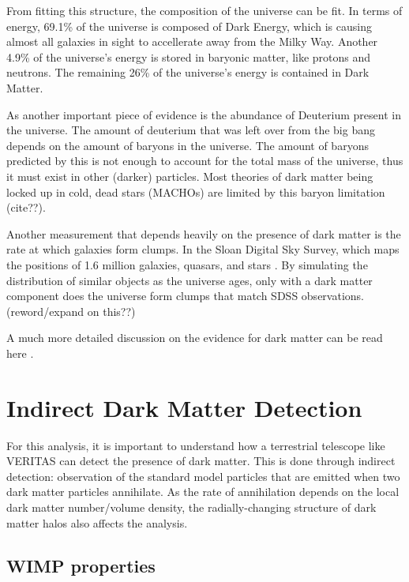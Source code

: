     From fitting this structure, the composition of the universe can be fit.
    In terms of energy, 69.1\% of the universe is composed of Dark Energy, which is causing almost all galaxies in sight to accellerate away from the Milky Way.
    Another 4.9\% of the universe's energy is stored in baryonic matter, like protons and neutrons.
    The remaining 26\% of the universe's energy is contained in Dark Matter\cite{planck2015}.

    As another important piece of evidence is the abundance of Deuterium present in the universe.
    The amount of deuterium that was left over from the big bang depends on the amount of baryons in the universe.
    The amount of baryons predicted by this is not enough to account for the total mass of the universe, thus it must exist in other (darker) particles.
    Most theories of dark matter being locked up in cold, dead stars (MACHOs) are limited by this baryon limitation {\color{red}(cite??)}.

    Another measurement that depends heavily on the presence of dark matter is the rate at which galaxies form clumps.
    In the Sloan Digital Sky Survey, which maps the positions of 1.6 million galaxies, quasars, and stars \cite{sdss_release}.
    By simulating the distribution of similar objects as the universe ages, only with a dark matter component does the universe form clumps that match SDSS observations.
    {\color{red}(reword/expand on this??)}
  
    A much more detailed discussion on the evidence for dark matter can be read here \cite{DMPrimer}.

\section{Indirect Dark Matter Detection}
  For this analysis, it is important to understand how a terrestrial telescope like VERITAS can detect the presence of dark matter.
  This is done through indirect detection: observation of the standard model particles that are emitted when two dark matter particles annihilate.
  As the rate of annihilation depends on the local dark matter number/volume density, the radially-changing structure of dark matter halos also affects the analysis.
  \subsection{WIMP properties}

